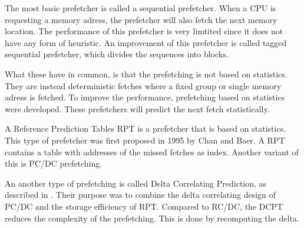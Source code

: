 The most basic prefetcher is called a sequential prefetcher. When a CPU is requesting a memory adress, the prefetcher will also fetch the next memory location. The performance of this prefetcher is very limtited since it does not have any form of heuristic. An improvement of this prefetcher is called tagged sequential prefetcher, which divides the sequences into blocks.

What these have in common, is that the prefetching is not based on statistics. They are instead deterministic fetches where a fixed group or single memory adress is fetched. To improve the performance, prefetching based on statistics were developed. These prefetchers will predict the next fetch statistically.   

A Reference Prediction Tables RPT is a prefetcher that is based on statistics. This type of prefetcher was first proposed in 1995 by Chan and Baer. A RPT contains a table with addresses of the missed fetches as index. Another variant of this is PC/DC prefetching. 

An another type of prefetching is called Delta Correlating Prediction, as described in \cite{reference:jahre}. Their purpose was to combine the delta correlating design of PC/DC and the storage efficiency of RPT. Compared to RC/DC, the DCPT reduces the complexity of the prefetching. This is done by recomputing the delta.
